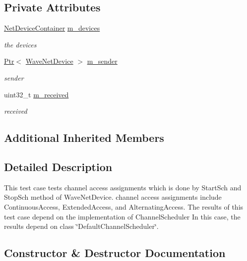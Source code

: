 \subsection*{Private Attributes}
\begin{DoxyCompactItemize}
\item 
\hyperlink{classns3_1_1NetDeviceContainer}{Net\+Device\+Container} \hyperlink{classChannelAccessTestCase_a36ad5644e4eb713b912aed42eb3fe4dc}{m\+\_\+devices}
\begin{DoxyCompactList}\small\item\em the devices \end{DoxyCompactList}\item 
\hyperlink{classns3_1_1Ptr}{Ptr}$<$ \hyperlink{classns3_1_1WaveNetDevice}{Wave\+Net\+Device} $>$ \hyperlink{classChannelAccessTestCase_af2ed348403976d1e39d0099313ed3680}{m\+\_\+sender}
\begin{DoxyCompactList}\small\item\em sender \end{DoxyCompactList}\item 
uint32\+\_\+t \hyperlink{classChannelAccessTestCase_a5926e14afc012dd8c71ab238435a3ec9}{m\+\_\+received}
\begin{DoxyCompactList}\small\item\em received \end{DoxyCompactList}\end{DoxyCompactItemize}
\subsection*{Additional Inherited Members}


\subsection{Detailed Description}
This test case tests channel access assignments which is done by Start\+Sch and Stop\+Sch method of Wave\+Net\+Device. channel access assignments include Continuous\+Access, Extended\+Access, and Alternating\+Access. The results of this test case depend on the implementation of Channel\+Scheduler In this case, the results depend on class \char`\"{}\+Default\+Channel\+Scheduler\char`\"{}. 

\subsection{Constructor \& Destructor Documentation}
